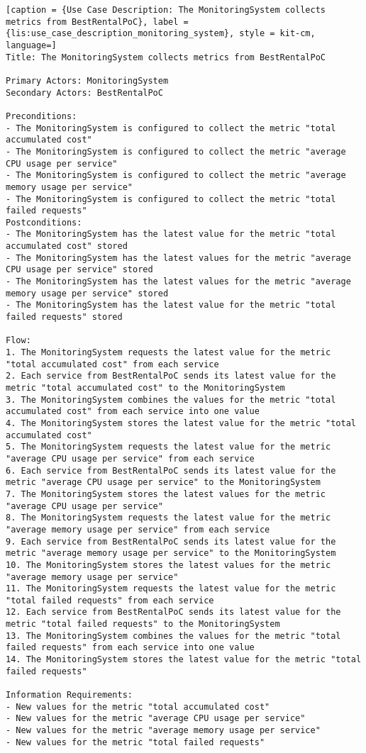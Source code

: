 \vspace{0.5cm}
\begin{lstlisting}[caption = {Use Case Description: The MonitoringSystem collects metrics from BestRentalPoC}, label = {lis:use_case_description_monitoring_system}, style = kit-cm, language=] 
Title: The MonitoringSystem collects metrics from BestRentalPoC

Primary Actors: MonitoringSystem
Secondary Actors: BestRentalPoC

Preconditions:
- The MonitoringSystem is configured to collect the metric "total accumulated cost"
- The MonitoringSystem is configured to collect the metric "average CPU usage per service"
- The MonitoringSystem is configured to collect the metric "average memory usage per service"
- The MonitoringSystem is configured to collect the metric "total failed requests"
Postconditions:
- The MonitoringSystem has the latest value for the metric "total accumulated cost" stored
- The MonitoringSystem has the latest values for the metric "average CPU usage per service" stored
- The MonitoringSystem has the latest values for the metric "average memory usage per service" stored
- The MonitoringSystem has the latest value for the metric "total failed requests" stored

Flow:
1. The MonitoringSystem requests the latest value for the metric "total accumulated cost" from each service
2. Each service from BestRentalPoC sends its latest value for the metric "total accumulated cost" to the MonitoringSystem
3. The MonitoringSystem combines the values for the metric "total accumulated cost" from each service into one value
4. The MonitoringSystem stores the latest value for the metric "total accumulated cost"
5. The MonitoringSystem requests the latest value for the metric "average CPU usage per service" from each service
6. Each service from BestRentalPoC sends its latest value for the metric "average CPU usage per service" to the MonitoringSystem
7. The MonitoringSystem stores the latest values for the metric "average CPU usage per service"
8. The MonitoringSystem requests the latest value for the metric "average memory usage per service" from each service
9. Each service from BestRentalPoC sends its latest value for the metric "average memory usage per service" to the MonitoringSystem
10. The MonitoringSystem stores the latest values for the metric "average memory usage per service"
11. The MonitoringSystem requests the latest value for the metric "total failed requests" from each service
12. Each service from BestRentalPoC sends its latest value for the metric "total failed requests" to the MonitoringSystem
13. The MonitoringSystem combines the values for the metric "total failed requests" from each service into one value
14. The MonitoringSystem stores the latest value for the metric "total failed requests"
	
Information Requirements: 
- New values for the metric "total accumulated cost"
- New values for the metric "average CPU usage per service"
- New values for the metric "average memory usage per service"
- New values for the metric "total failed requests"
\end{lstlisting}


